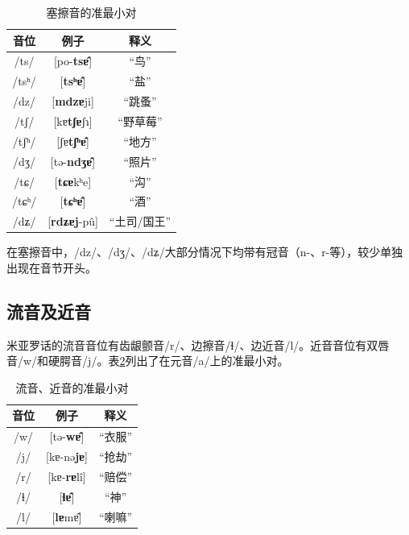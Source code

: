 \begin{table}[H]
\vspace{5pt}
    \centering
    \caption{塞擦音的准最小对}
    \label{affricate}
\begin{tabular}{ccc}
   \toprule
    音位 & 例子 & 释义 \\
   \midrule
   /ts/ & [po-\textbf{tsɐ̂}] & “鸟”  \\
   /tsʰ/ & [\textbf{tsʰɐ̂}] & “盐”  \\
   /dz/ & [\textbf{mdzɐ}ji] & “跳蚤”  \\
   /tʃ/ & [kɐ\textbf{tʃɐ}ʃɿ] & “野草莓”  \\
   /tʃʰ/ & [ʃɐ\textbf{tʃʰɐ̂}] & “地方”  \\
   /dʒ/ & [tə-\textbf{ndʒɐ̂}] & “照片”  \\
   /tɕ/ & [\textbf{tɕɐ}kʰe] & “沟”  \\
   /tɕʰ/ & [\textbf{tɕʰɐ̂}] & “酒”  \\
   /dʑ/ & [\textbf{rdʑɐj}-pû] & “土司/国王”  \\
   \bottomrule
\end{tabular}
\end{table}

在塞擦音中，/dz/、/dʒ/、/dʑ/大部分情况下均带有冠音（n-、r-等），较少单独出现在音节开头。

\subsection{流音及近音}

米亚罗话的流音音位有齿龈颤音/r/、边擦音/ɬ/、边近音/l/。近音音位有双唇音/w/和硬腭音/j/。表\ref{floex}列出了在元音/a/上的准最小对。

\begin{table}[H]
\vspace{5pt}
    \centering
    \caption{流音、近音的准最小对}
    \label{floex}
\begin{tabular}{ccc}
   \toprule
    音位 & 例子 & 释义 \\
   \midrule
   /w/ & [tə-\textbf{wɐ̂}] & “衣服”  \\
   /j/ & [kɐ-nə\textbf{jɐ}] & “抢劫” \\
   /r/ & [kɐ-\textbf{rɐ}lî] & “赔偿”  \\
   /ɬ/ & [\textbf{ɬɐ̂}] & “神”  \\
   /l/ & [\textbf{lɐ}mɐ̂] & “喇嘛”  \\
   \bottomrule
\end{tabular}
\end{table}


